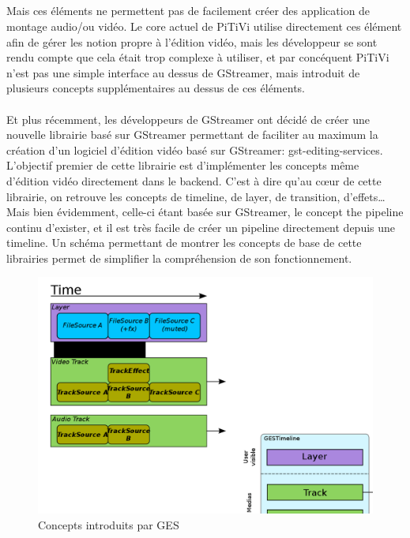 \subparagraph{}

Mais ces éléments ne permettent pas de facilement créer des application
de montage audio/ou vidéo. Le core actuel de PiTiVi utilise directement
ces élément afin de gérer les notion propre à l'édition vidéo,
mais les développeur se sont rendu compte que cela était trop complexe
à utiliser, et par concéquent PiTiVi n'est pas une simple interface au
dessus de GStreamer, mais introduit de plusieurs concepts supplémentaires
au dessus de ces éléments.

\paragraph{}

Et plus récemment, les développeurs de GStreamer ont décidé de créer
une nouvelle librairie basé sur GStreamer permettant de faciliter
au maximum la création d'un logiciel d'édition vidéo basé sur
GStreamer: gst-editing-services.  L'objectif premier de cette librairie
est d'implémenter les concepts même d'édition vidéo directement dans
le backend. C'est à dire qu'au cœur de cette librairie, on retrouve
les concepts de timeline, de layer, de transition, d'effets\ldots Mais
bien évidemment, celle-ci étant basée sur GStreamer, le concept
the pipeline continu d'exister, et il est très facile de créer un
pipeline directement depuis une timeline. Un schéma permettant de
montrer les concepts de base de cette librairies permet de simplifier
la compréhension de son fonctionnement.

\begin{figure} [H]

  \begin{center}

    \includegraphics[width=1.0\textwidth]{images/ges}

  \end{center}

  \caption{Concepts introduits par GES}

  \label{Yes}

\end{figure}

